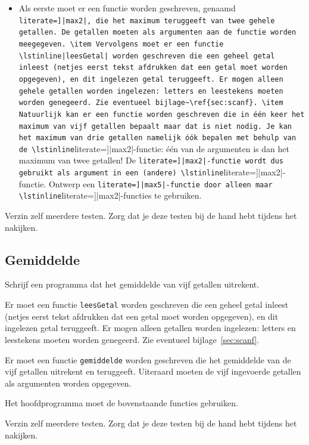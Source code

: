 \documentclass[a4paper,10pt,fleqn,twoside]{article}
\begin{document}
\begin{itemize}
\item Als eerste moet er een functie worden geschreven, genaamd \lstinline[literate=]|max2|, die het maximum teruggeeft van twee gehele getallen. De getallen moeten als argumenten aan de functie worden meegegeven.
\item Vervolgens moet er een functie \lstinline|leesGetal| worden geschreven die een geheel getal inleest (netjes eerst tekst afdrukken dat een getal moet worden opgegeven), en dit ingelezen getal teruggeeft. Er mogen alleen gehele getallen worden ingelezen: letters en leestekens moeten worden genegeerd. Zie eventueel bijlage~\ref{sec:scanf}.
\item Natuurlijk kan er een functie worden geschreven die in één keer het maximum van vijf getallen bepaalt maar dat is niet nodig. Je kan het maximum van drie getallen namelijk óók bepalen met behulp van de \lstinline[literate=]|max2|-functie: één van de argumenten is dan het maximum van twee getallen! De \lstinline[literate=]|max2|-functie wordt dus gebruikt als argument in een (andere) \lstinline[literate=]|max2|-functie. Ontwerp een \lstinline[literate=]|max5|-functie door alleen maar \lstinline[literate=]|max2|-functies te gebruiken.
\end{itemize}

Verzin zelf meerdere testen. Zorg dat je deze testen bij de hand hebt tijdens het nakijken.

\subsection{Gemiddelde}
Schrijf een programma dat het gemiddelde van vijf getallen uitrekent.

Er moet een functie \lstinline|leesGetal| worden geschreven die een geheel getal inleest (netjes eerst tekst afdrukken dat een getal moet worden opgegeven), en dit ingelezen getal teruggeeft. Er mogen alleen getallen worden ingelezen: letters en leestekens moeten worden genegeerd.  Zie eventueel bijlage~\ref{sec:scanf}.

Er moet een functie \lstinline|gemiddelde| worden geschreven die het gemiddelde van de vijf getallen uitrekent en teruggeeft. Uiteraard moeten de vijf ingevoerde getallen als argumenten worden opgegeven.

Het hoofdprogramma moet de bovenstaande functies gebruiken.

Verzin zelf meerdere testen. Zorg dat je deze testen bij de hand hebt tijdens het nakijken.
\end{document}
